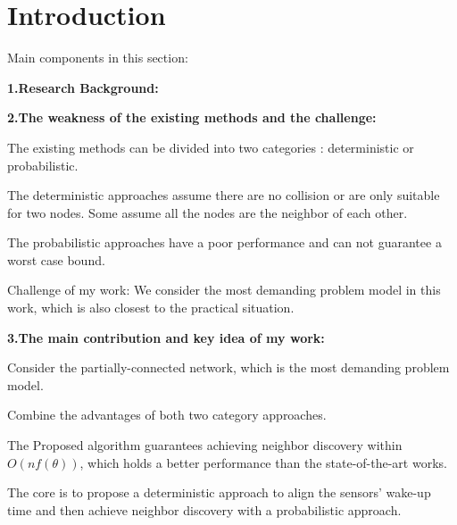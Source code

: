 \section{Introduction}

Main components in this section:

\textbf{1.Research Background:}

\textbf{2.The weakness of the existing methods and the challenge:}

The existing methods can be divided into two categories :  deterministic or probabilistic.

The deterministic approaches assume there are no collision or are only suitable for two nodes.
Some assume all the nodes are the neighbor of each other.

The probabilistic approaches have a poor performance and can not guarantee a worst case bound. 


Challenge of my work:
We consider the most demanding problem model in this work, which is also closest to the practical situation.

\textbf{3.The main contribution and key idea of my work:}

Consider the partially-connected network, which is the most demanding problem model.

Combine the advantages of both two category approaches.

The Proposed algorithm guarantees achieving neighbor discovery within $O(nf(\theta))$, which holds a better
performance than the state-of-the-art works.

The core is to propose a deterministic approach to  align the sensors' wake-up time and then achieve neighbor discovery with a probabilistic approach.




